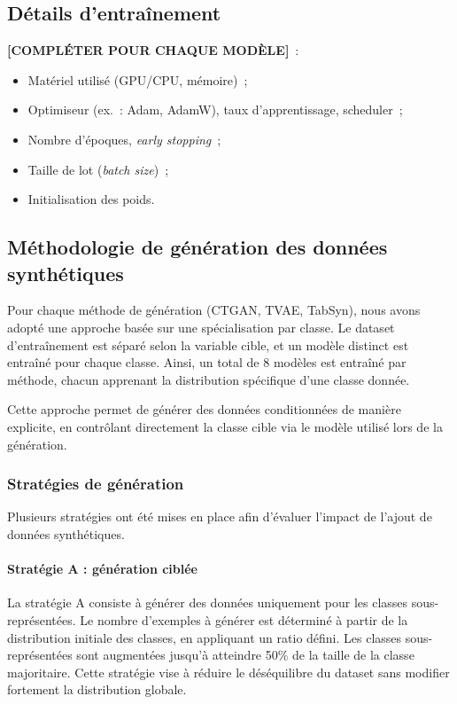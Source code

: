 \documentclass[conference]{IEEEtran}
\begin{document}
\subsection{Détails d'entraînement}

\textbf{[COMPLÉTER POUR CHAQUE MODÈLE]}~:
\begin{itemize}
  \item Matériel utilisé (GPU/CPU, mémoire)~;
  \item Optimiseur (ex.~: Adam, AdamW), taux d'apprentissage, scheduler~;
  \item Nombre d'époques, \textit{early stopping}~;
  \item Taille de lot (\textit{batch size})~;
  \item Initialisation des poids.
\end{itemize}


\subsection{Méthodologie de génération des données synthétiques}

Pour chaque méthode de génération (CTGAN, TVAE, TabSyn), nous avons adopté une approche basée sur une spécialisation par classe. Le dataset d’entraînement est séparé selon la variable cible, et un modèle distinct est entraîné pour chaque classe. Ainsi, un total de 8 modèles est entraîné par méthode, chacun apprenant la distribution spécifique d’une classe donnée.

Cette approche permet de générer des données conditionnées de manière explicite, en contrôlant directement la classe cible via le modèle utilisé lors de la génération.\\

\subsubsection{Stratégies de génération}\mbox{}

Plusieurs stratégies ont été mises en place afin d’évaluer l’impact de l’ajout de données synthétiques.\\

\paragraph{Stratégie A : génération ciblée}\mbox{}

La stratégie A consiste à générer des données uniquement pour les classes sous-représentées. Le nombre d’exemples à générer est déterminé à partir de la distribution initiale des classes, en appliquant un ratio défini. Les classes sous-représentées sont augmentées jusqu’à atteindre 50\% de la taille de la classe majoritaire. Cette stratégie vise à réduire le déséquilibre du dataset sans modifier fortement la distribution globale.
\end{document}
